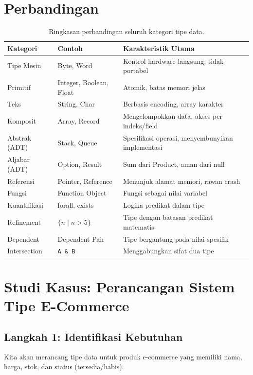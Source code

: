 \documentclass[11pt,a4paper]{article}
\begin{document}
	\section{Perbandingan}
	
	\begin{table}[H]
		\centering
		\caption{Ringkasan perbandingan seluruh kategori tipe data.}
		\label{tab:summary}
		\footnotesize
		\begin{tabularx}{\textwidth}{l X X}
			\toprule
			Kategori & Contoh & Karakteristik Utama \\
			\midrule
			Tipe Mesin & Byte, Word & Kontrol hardware langsung, tidak portabel \\
			Primitif & Integer, Boolean, Float & Atomik, batas memori jelas \\
			Teks & String, Char & Berbasis encoding, array karakter \\
			Komposit & Array, Record & Mengelompokkan data, akses per indeks/field \\
			Abstrak (ADT) & Stack, Queue & Spesifikasi operasi, menyembunyikan implementasi \\
			Aljabar (ADT) & Option, Result & Sum dari Product, aman dari null \\
			Referensi & Pointer, Reference & Menunjuk alamat memori, rawan crash \\
			Fungsi & Function Object & Fungsi sebagai nilai variabel \\
			Kuantifikasi & forall, exists & Logika predikat dalam tipe \\
			Refinement & $\{n \mid n > 5\}$ & Tipe dengan batasan predikat matematis \\
			Dependent & Dependent Pair & Tipe bergantung pada nilai spesifik \\
			Intersection & \texttt{A \& B} & Menggabungkan sifat dua tipe \\
			\bottomrule
		\end{tabularx}
	\end{table}
	
	\section{Studi Kasus: Perancangan Sistem Tipe E-Commerce}
	
	\subsection{Langkah 1: Identifikasi Kebutuhan}
	Kita akan merancang tipe data untuk produk e-commerce yang memiliki nama, harga, stok, dan status (tersedia/habis).
	
\end{document}
